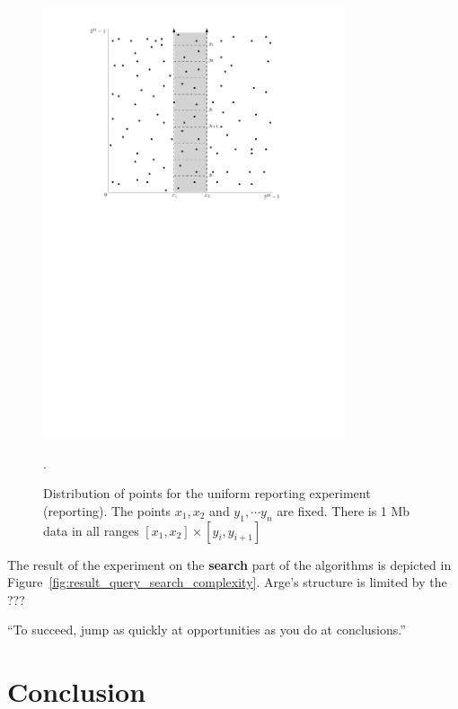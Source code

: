 \documentclass[twoside,11pt,openright]{report}
\begin{document}
\begin{figure}[h]
	\centering
	\includegraphics[width=0.8\textwidth]{../figures/query_uniform_fix_x}
	\caption{Distribution of points for the uniform reporting experiment (reporting). The points $x_1, x_2$ and $y_1, \cdots y_n$ are fixed. There is 1 Mb data in all ranges $[x_1, x_2] \times [y_i, y_{i+1}]$}.
	\label{fig:experiment_query_uniform_fix_x}
\end{figure}


The result of the experiment on the \textbf{search} part of the algorithms is depicted in Figure~\ref{fig:result_query_search_complexity}. Arge's structure is limited by the ???

\begin{savequote}[0.4\textwidth]
``To succeed, jump as quickly at opportunities as you do at conclusions.''
\end{savequote}
\chapter{Conclusion}
\label{chp:conclusion}
\end{document}
